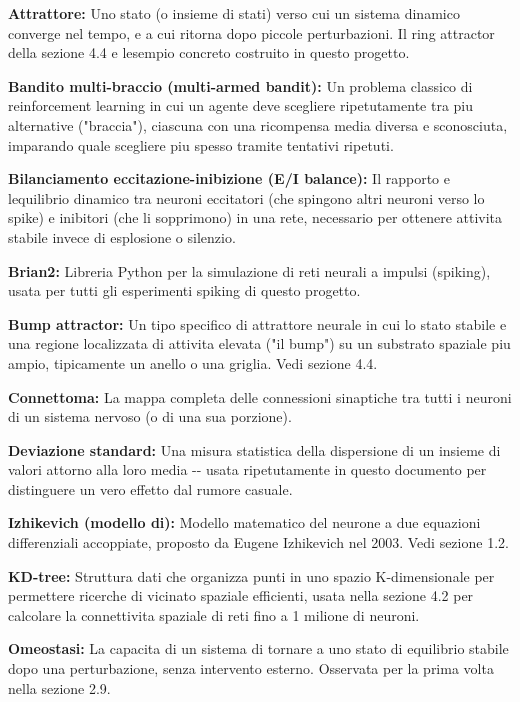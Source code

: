 \documentclass[
  italian,
]{article}
\begin{document}
\textbf{Attrattore:} Uno stato (o insieme di stati) verso cui un sistema dinamico converge nel tempo, e a cui ritorna dopo piccole perturbazioni. Il ring attractor della sezione 4.4 e\textquotesingle{} l\textquotesingle esempio concreto costruito in questo progetto.

\textbf{Bandito multi-braccio (multi-armed bandit):} Un problema classico di reinforcement learning in cui un agente deve scegliere ripetutamente tra piu\textquotesingle{} alternative ("braccia"), ciascuna con una ricompensa media diversa e sconosciuta, imparando quale scegliere piu\textquotesingle{} spesso tramite tentativi ripetuti.

\textbf{Bilanciamento eccitazione-inibizione (E/I balance):} Il rapporto e l\textquotesingle equilibrio dinamico tra neuroni eccitatori (che spingono altri neuroni verso lo spike) e inibitori (che li sopprimono) in una rete, necessario per ottenere attivita\textquotesingle{} stabile invece di esplosione o silenzio.

\textbf{Brian2:} Libreria Python per la simulazione di reti neurali a impulsi (spiking), usata per tutti gli esperimenti spiking di questo progetto.

\textbf{Bump attractor:} Un tipo specifico di attrattore neurale in cui lo stato stabile e\textquotesingle{} una regione localizzata di attivita\textquotesingle{} elevata ("il bump") su un substrato spaziale piu\textquotesingle{} ampio, tipicamente un anello o una griglia. Vedi sezione 4.4.

\textbf{Connettoma:} La mappa completa delle connessioni sinaptiche tra tutti i neuroni di un sistema nervoso (o di una sua porzione).

\textbf{Deviazione standard:} Una misura statistica della dispersione di un insieme di valori attorno alla loro media -\/- usata ripetutamente in questo documento per distinguere un vero effetto dal rumore casuale.

\textbf{Izhikevich (modello di):} Modello matematico del neurone a due equazioni differenziali accoppiate, proposto da Eugene Izhikevich nel 2003. Vedi sezione 1.2.

\textbf{KD-tree:} Struttura dati che organizza punti in uno spazio K-dimensionale per permettere ricerche di vicinato spaziale efficienti, usata nella sezione 4.2 per calcolare la connettivita\textquotesingle{} spaziale di reti fino a 1 milione di neuroni.

\textbf{Omeostasi:} La capacita\textquotesingle{} di un sistema di tornare a uno stato di equilibrio stabile dopo una perturbazione, senza intervento esterno. Osservata per la prima volta nella sezione 2.9.
\end{document}
